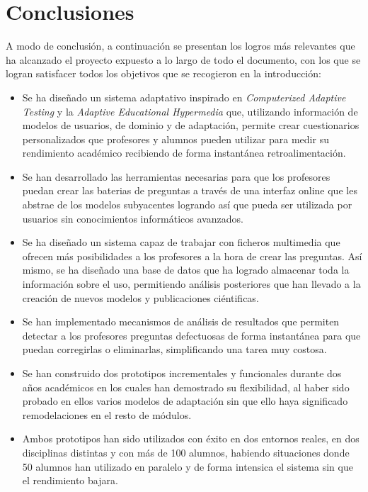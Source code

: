 \chapter{Conclusiones\label{sec:conclusiones}}

A modo de conclusión, a continuación se presentan los logros más relevantes que ha alcanzado el proyecto expuesto a lo largo de todo el documento, con los que se logran satisfacer todos los objetivos que se recogieron en la introducción:

\begin{itemize}
	\item Se ha diseñado un sistema adaptativo inspirado en \textit{Computerized Adaptive Testing} y la \textit{Adaptive Educational Hypermedia} que, utilizando información de modelos de usuarios, de dominio y de adaptación, permite crear cuestionarios personalizados que profesores y alumnos pueden utilizar para medir su rendimiento académico recibiendo de forma instantánea retroalimentación.
	\item Se han desarrollado las herramientas necesarias para que los profesores puedan crear las baterias de preguntas a través de una interfaz online que les abstrae de los modelos subyacentes logrando así que pueda ser utilizada por usuarios sin conocimientos informáticos avanzados.
	\item Se ha diseñado un sistema capaz de trabajar con ficheros multimedia que ofrecen más posibilidades a los profesores a la hora de crear las preguntas. Así mismo, se ha diseñado una base de datos que ha logrado almacenar toda la información sobre el uso, permitiendo análisis posteriores que han llevado a la creación de nuevos modelos y publicaciones ciéntificas.
	\item Se han implementado mecanismos de análisis de resultados que permiten detectar a los profesores preguntas defectuosas de forma instantánea para que puedan corregirlas o eliminarlas, simplificando una tarea muy costosa.
	\item Se han construido dos prototipos incrementales y funcionales durante dos años académicos en los cuales han demostrado su flexibilidad, al haber sido probado en ellos varios modelos de adaptación sin que ello haya significado remodelaciones en el resto de módulos.
	\item Ambos prototipos han sido utilizados con éxito en dos entornos reales, en dos disciplinas distintas y con más de 100 alumnos, habiendo situaciones donde 50 alumnos han utilizado en paralelo y de forma intensica el sistema sin que el rendimiento bajara.
\end{itemize}

